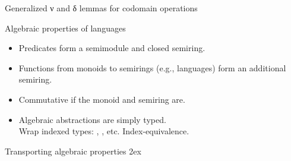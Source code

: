 \documentclass[aspectratio=169]{beamer}
\begin{document}
\begin{frame}{Generalized ν and δ lemmas for codomain operations}
\centering
{}
\end{frame}

\begin{frame}{Algebraic properties of languages}
\begin{itemize}\itemsep4ex
\item Predicates form a semimodule and closed semiring.
\item Functions from monoids to semirings (e.g., languages) form an additional semiring.
\item Commutative if the monoid and semiring are.
\item Algebraic abstractions are simply typed.\\[2ex]
      Wrap indexed types: { }, { }, etc.
      Index-equivalence.
\end{itemize}
\end{frame}

\rnc{}

\begin{frame}{Transporting algebraic properties}
\vspace{1.5ex}
\AgdaEmptySkip2ex
\end{frame}
\end{document}
